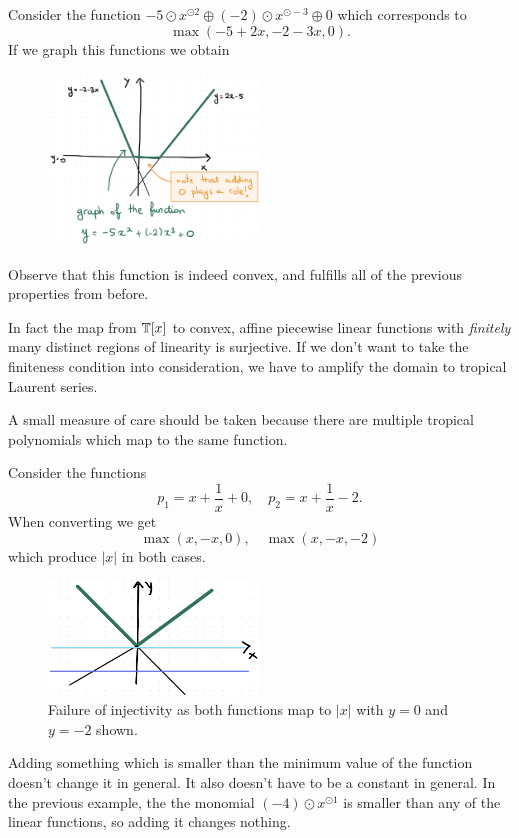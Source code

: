 \documentclass[12pt]{memoir}
\theoremstyle{definition}
\begin{document}
\begin{Ex}
    Consider the function $-5\odot x^{\odot2}\oplus(-2)\odot x^{\odot-3}\oplus 0$ which corresponds to 
    $$\max(-5+2x,-2-3x,0).$$
    If we graph this functions we obtain
    \begin{figure}[h!]
        \centering
        \includegraphics[width=0.5\textwidth]{figs/fig3-1RenzoNotes3.png}
        \label{fig:3.1-ConvPLFunc}
    \end{figure}
    Observe that this function is indeed convex, and fulfills all of the previous properties from before. 
\end{Ex}

In fact the map from $\mathbb{T}[x]$ to convex, affine piecewise linear functions with \emph{finitely} many distinct regions of linearity is surjective. If we don't want to take the finiteness condition into consideration, we have to amplify the domain to tropical Laurent series.\par 
A small measure of care should be taken because there are multiple tropical polynomials which map to the same function.

\begin{Ex}
    Consider the functions 
    $$p_1=x+\frac{1}{x}+0,\quad p_2=x+\frac1x-2.$$
    When converting we get 
    $$\max(x,-x,0),\quad\max(x,-x,-2)$$
    which produce $|x|$ in both cases.
    \begin{figure}[h!]
        \centering
        \includegraphics[width=0.5\textwidth]{figs/fig3-2RenzoNotes3.png}
        \caption{Failure of injectivity as both functions map to $|x|$ with $y=0$ and $y=-2$ shown.}
        \label{fig:3.2-InjectivityFailure}
    \end{figure}
    Adding something which is smaller than the minimum value of the function doesn't change it in general. It also doesn't have to be a constant in general. In the previous example, the the monomial $(-4)\odot x^{\odot 1}$ is smaller than any of the linear functions, so adding it changes nothing.
\end{Ex}
\end{document}
